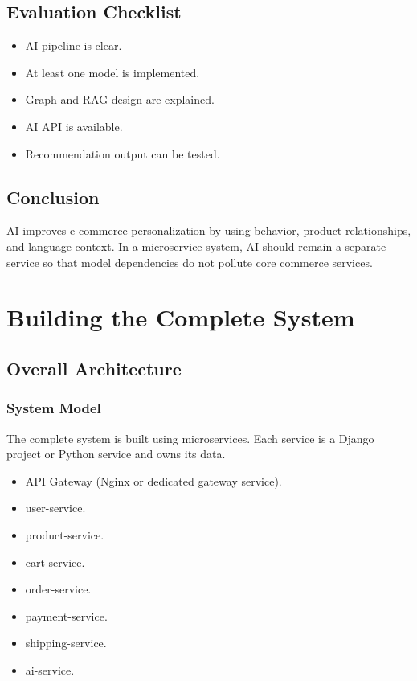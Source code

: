 \documentclass[12pt,a4paper]{article}
\begin{document}
\subsection{Evaluation Checklist}

\begin{itemize}
    \item AI pipeline is clear.
    \item At least one model is implemented.
    \item Graph and RAG design are explained.
    \item AI API is available.
    \item Recommendation output can be tested.
\end{itemize}

\subsection{Conclusion}

AI improves e-commerce personalization by using behavior, product relationships, and language context. In a microservice system, AI should remain a separate service so that model dependencies do not pollute core commerce services.

\section{Building the Complete System}

\subsection{Overall Architecture}

\subsubsection{System Model}

The complete system is built using microservices. Each service is a Django project or Python service and owns its data.

\begin{itemize}
    \item API Gateway (Nginx or dedicated gateway service).
    \item user-service.
    \item product-service.
    \item cart-service.
    \item order-service.
    \item payment-service.
    \item shipping-service.
    \item ai-service.
\end{itemize}
\end{document}
